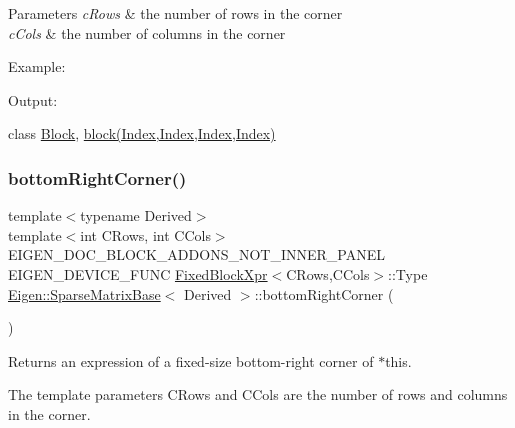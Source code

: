 \begin{DoxyParams}{Parameters}
{\em c\+Rows} & the number of rows in the corner \\
\hline
{\em c\+Cols} & the number of columns in the corner\\
\hline
\end{DoxyParams}
Example\+: 
\begin{DoxyCodeInclude}{0}
\end{DoxyCodeInclude}
 Output\+: 
\begin{DoxyVerbInclude}
\end{DoxyVerbInclude}
 class \mbox{\hyperlink{class_eigen_1_1_block}{Block}}, \mbox{\hyperlink{class_eigen_1_1_sparse_matrix_base_a7c28a2f511181c727396d5e813519d38}{block(\+Index,\+Index,\+Index,\+Index)}} \mbox{\label{class_eigen_1_1_sparse_matrix_base_a3f810c062c1bc3cad4ae82be15c15636}} 
\subsubsection{\texorpdfstring{bottomRightCorner()}{bottomRightCorner()}\hspace{0.1cm}{\footnotesize\ttfamily [2/3]}}
{\footnotesize\ttfamily template$<$typename Derived$>$ \\
template$<$int C\+Rows, int C\+Cols$>$ \\
E\+I\+G\+E\+N\+\_\+\+D\+O\+C\+\_\+\+B\+L\+O\+C\+K\+\_\+\+A\+D\+D\+O\+N\+S\+\_\+\+N\+O\+T\+\_\+\+I\+N\+N\+E\+R\+\_\+\+P\+A\+N\+EL E\+I\+G\+E\+N\+\_\+\+D\+E\+V\+I\+C\+E\+\_\+\+F\+U\+NC \mbox{\hyperlink{struct_eigen_1_1_sparse_matrix_base_1_1_fixed_block_xpr}{Fixed\+Block\+Xpr}}$<$C\+Rows,C\+Cols$>$\+::Type \mbox{\hyperlink{class_eigen_1_1_sparse_matrix_base}{Eigen\+::\+Sparse\+Matrix\+Base}}$<$ Derived $>$\+::bottom\+Right\+Corner (\begin{DoxyParamCaption}{ }\end{DoxyParamCaption})\hspace{0.3cm}{\ttfamily [inline]}}

\begin{DoxyReturn}{Returns}
an expression of a fixed-\/size bottom-\/right corner of $\ast$this.
\end{DoxyReturn}
The template parameters C\+Rows and C\+Cols are the number of rows and columns in the corner.

